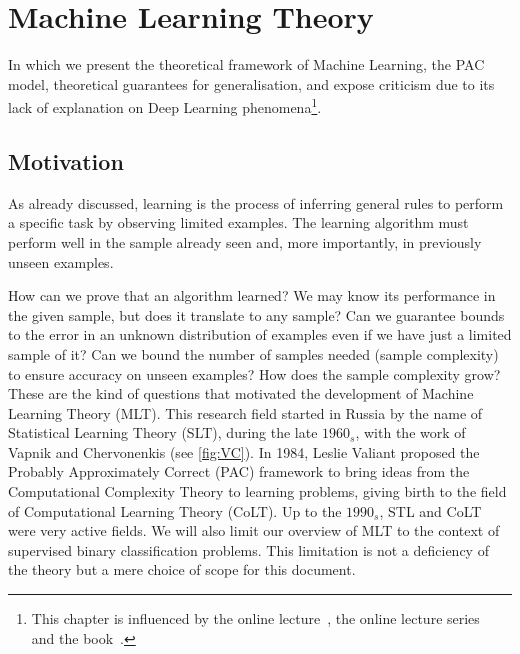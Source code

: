 

\chapter{Machine Learning Theory}\label{ch:mlt}


In which we present the theoretical framework of Machine Learning, the PAC model, theoretical guarantees for generalisation, and expose criticism due to its lack of explanation on Deep Learning phenomena\footnote{This chapter is influenced by the online lecture~, the online lecture series~ and the book~. }.

\section{Motivation} As already discussed, learning is the process of inferring general rules to perform a specific task by observing limited examples. The learning algorithm must perform well in the sample already seen and, more importantly, in previously unseen examples.

How can we prove that an algorithm learned? We may know its performance in the given sample, but does it translate to any sample? Can we guarantee bounds to the error in an unknown distribution of examples even if we have just a limited sample of it? Can we bound the number of samples needed (sample complexity) to ensure accuracy on unseen examples? How does the sample complexity grow?
These are the kind of questions that motivated the development of Machine Learning Theory (MLT). This research field started in Russia by the name of Statistical Learning Theory (SLT), during the late \(1960_s\), with the work of Vapnik and Chervonenkis (see \cref{fig:VC}). In 1984, Leslie Valiant proposed the Probably Approximately Correct (PAC) framework to bring ideas from the Computational Complexity Theory to learning problems, giving birth to the field of Computational Learning Theory (CoLT). Up to the \(1990_s\), STL and CoLT were very active fields.
We will also limit our overview of MLT to the context of supervised binary classification problems. This limitation is not a deficiency of the theory but a mere choice of scope for this document.


